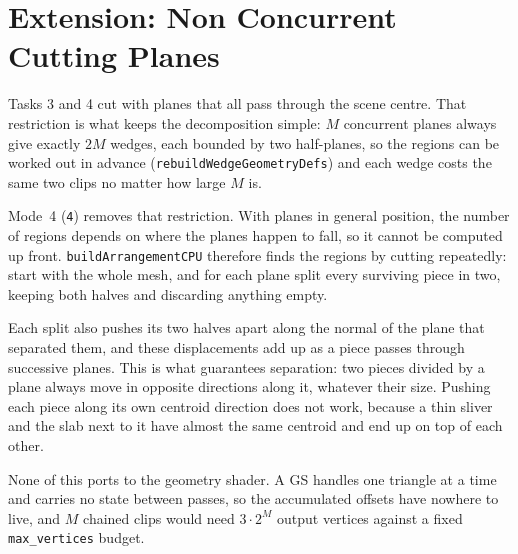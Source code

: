 \documentclass[10pt]{article}
\begin{document}

\vspace{-4pt}


\section*{Extension: Non Concurrent Cutting Planes}
Tasks 3 and 4 cut with planes that all pass through the scene centre. That
restriction is what keeps the decomposition simple: $M$ concurrent planes always
give exactly $2M$ wedges, each bounded by two half-planes, so the regions can be
worked out in advance (\texttt{rebuildWedgeGeometryDefs}) and each wedge costs the
same two clips no matter how large $M$ is.

Mode~4 (\texttt{4}) removes that restriction. With planes in general position, the
number of regions depends on where the planes happen to fall, so it cannot be
computed up front. \texttt{buildArrangementCPU} therefore finds the regions by
cutting repeatedly: start with the whole mesh, and for each plane split every
surviving piece in two, keeping both halves and discarding anything empty.

Each split also pushes its two halves apart along the normal of the plane that
separated them, and these displacements add up as a piece passes through
successive planes. This is what guarantees separation: two pieces divided by a
plane always move in opposite directions along it, whatever their size. Pushing
each piece along its own centroid direction does not work, because a thin sliver
and the slab next to it have almost the same centroid and end up on top of each
other.

None of this ports to the geometry shader. A GS handles one triangle at a time
and carries no state between passes, so the accumulated offsets have nowhere to
live, and $M$ chained clips would need $3\cdot2^M$ output vertices against a
fixed \texttt{max\_vertices} budget.
\end{document}
